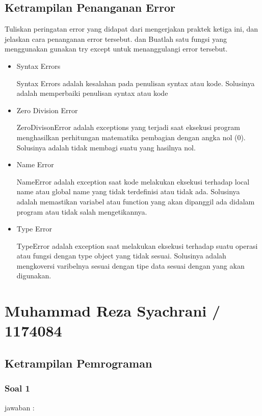 \subsection{Ketrampilan Penanganan Error}
Tuliskan peringatan error yang didapat dari mengerjakan praktek ketiga ini, dan jelaskan cara penanganan error tersebut. dan Buatlah satu fungsi yang menggunakan gunakan try except untuk menanggulangi error tersebut.
\begin{itemize}
\item Syntax Errors

Syntax Errors adalah kesalahan pada penulisan syntax atau kode. Solusinya adalah memperbaiki penulisan syntax atau kode

\item Zero Division Error

ZeroDivisonError adalah exceptions yang terjadi saat eksekusi program menghasilkan perhitungan matematika pembagian dengan angka nol (0). Solusinya adalah tidak membagi suatu yang hasilnya nol.

\item Name Error

NameError adalah exception saat kode melakukan eksekusi terhadap local name atau global name yang tidak terdefinisi atau tidak ada. Solusinya adalah memastikan variabel atau function yang akan dipanggil ada didalam program atau tidak salah mengetikannya.

\item Type Error

TypeError adalah exception saat melakukan eksekusi terhadap suatu operasi atau fungsi dengan type object yang tidak sesuai. Solusinya adalah mengkoversi varibelnya sesuai dengan tipe data sesuai dengan yang akan digunakan.

\end{itemize}



\section{Muhammad Reza Syachrani / 1174084}
\subsection{Ketrampilan Pemrograman}
\subsubsection{Soal 1}
jawaban : 


